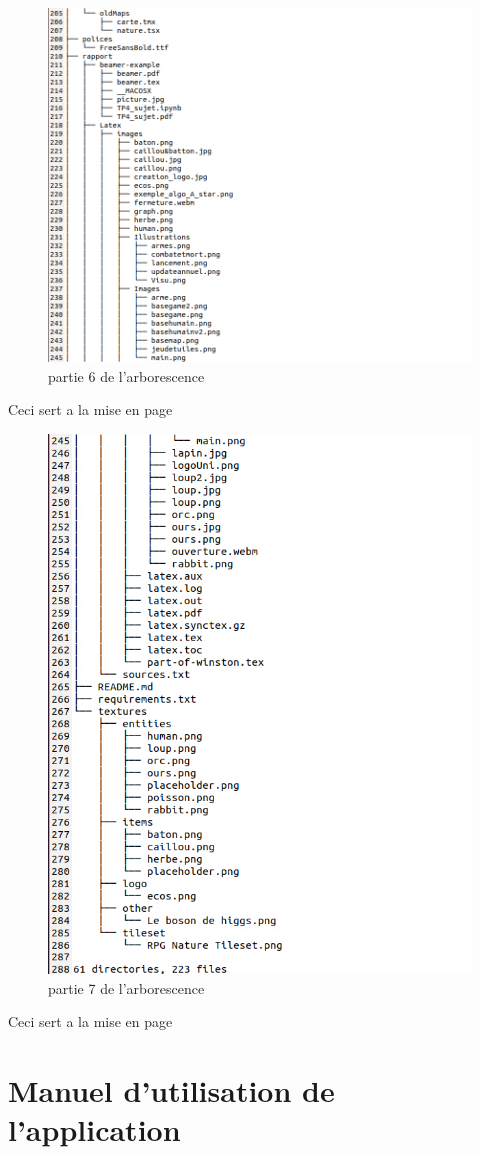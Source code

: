 \documentclass[a4paper, 11pt]{article}
\begin{document}
\begin{figure}[ht!]
 \centering
 \includegraphics[width=0.5\linewidth]{images/arborecsens/arbrepart6.png}
 \caption{partie 6 de l'arborescence}
 \label{fig::example::one}
\end{figure}
\newpage
{\color{white}Ceci sert a la mise en page}

\begin{figure}[ht!]
 \centering
 \includegraphics[width=0.5\linewidth]{images/arborecsens/arbrepart7.png}
 \caption{partie 7 de l'arborescence}
 \label{fig::example::one}
\end{figure}
{\color{white}Ceci sert a la mise en page}
\newpage

\section{Manuel d'utilisation de l'application }
\end{document}
